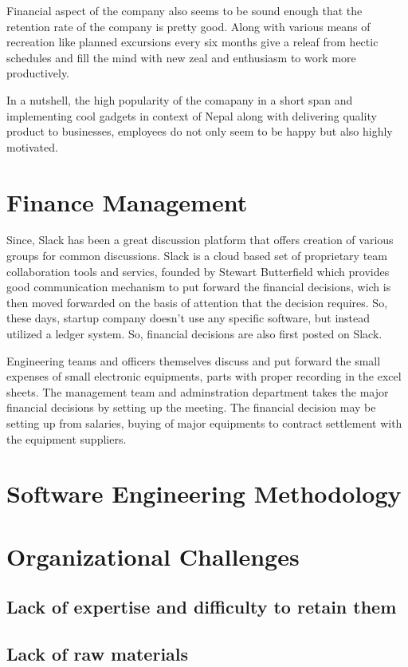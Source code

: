 \documentclass[12pt,a4paper]{scrreprt}
\begin{document}
Financial aspect of the company also seems to be sound enough that the retention rate of the company is pretty good. Along with various means of recreation like planned excursions every six months give a releaf from hectic schedules and fill the mind with new zeal and enthusiasm to work more productively.
 
In a nutshell, the high popularity of the comapany in a short span and implementing cool gadgets in context of Nepal along with delivering quality product to businesses, employees do not only seem to be happy but also highly motivated.

\chapter{Finance Management}
Since, Slack has been a great discussion platform that offers creation of various groups for common discussions. Slack is a cloud based set of proprietary team collaboration tools and servics, founded by Stewart Butterfield which provides good communication mechanism to put forward the financial decisions, wich is then moved forwarded on the basis of attention that the decision requires. So, these days, startup company doesn't use any specific software, but instead utilized a ledger system. So, financial decisions are also first posted on Slack.\par
Engineering teams and officers themselves discuss and put forward the small expenses of small electronic equipments, parts with proper recording in the excel sheets. The management team and adminstration department takes the major financial decisions by setting up the meeting. The financial decision may be setting up from salaries, buying of major equipments to contract settlement with the equipment suppliers.
\chapter{Software Engineering Methodology}

\chapter{Organizational Challenges}
\section{Lack of expertise and difficulty to retain them}
\section{Lack of raw materials}
\end{document}
